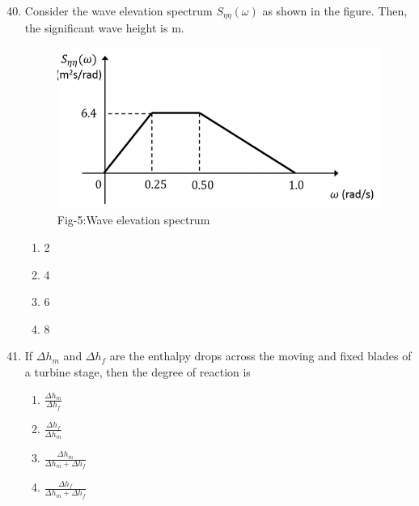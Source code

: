 \documentclass[journal]{IEEEtran}
\theoremstyle{remark}
\begin{document}
\begin{enumerate}[itemsep=1em]
\setcounter{enumi}{39}
\item Consider the wave elevation spectrum $S_{\eta\eta}(\omega)$ as shown in the figure. Then, the significant wave height is \underline{\hspace{1cm}} m.
\begin{figure}[H]
    \centering
    \includegraphics[width=0.3\columnwidth]{figs/fig-5.jpeg}
    \caption*{Fig-5:Wave elevation spectrum}
    \label{fig-5}
\end{figure}
\begin{multicols}{4}
\begin{enumerate}
    \item 2
    \item 4
    \item 6
    \item 8
\end{enumerate}    
\end{multicols}
\end{enumerate}

\newpage
\vspace*{0.25cm}

\begin{enumerate}[itemsep=1em]
\setcounter{enumi}{40}
\item If $\Delta h_m$ and $\Delta h_f$ are the enthalpy drops across the moving and fixed blades of a turbine stage, then the degree of reaction is 
\begin{multicols}{4}
\begin{enumerate}
    \item $\frac{\Delta h_m}{\Delta h_f}$
    \item $\frac{\Delta h_f}{\Delta h_m}$
    \item $\frac{\Delta h_m}{\Delta h_m + \Delta h_f}$
    \item $\frac{\Delta h_f}{\Delta h_m + \Delta h_f}$
\end{enumerate}
\end{multicols}
\end{enumerate}
\end{document}
